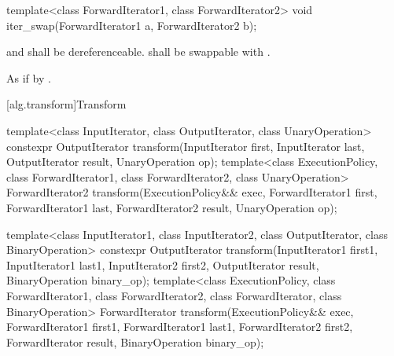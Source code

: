 %
\begin{itemdecl}
template<class ForwardIterator1, class ForwardIterator2>
  void iter_swap(ForwardIterator1 a, ForwardIterator2 b);
\end{itemdecl}

\begin{itemdescr}
\pnum
\requires
{} and  shall be dereferenceable.  shall be
swappable with .

\pnum
\effects
As if by .
\end{itemdescr}

[alg.transform]{Transform}

%
\begin{itemdecl}
template<class InputIterator, class OutputIterator,
         class UnaryOperation>
  constexpr OutputIterator
    transform(InputIterator first, InputIterator last,
              OutputIterator result, UnaryOperation op);
template<class ExecutionPolicy, class ForwardIterator1, class ForwardIterator2,
         class UnaryOperation>
  ForwardIterator2
    transform(ExecutionPolicy&& exec,
              ForwardIterator1 first, ForwardIterator1 last,
              ForwardIterator2 result, UnaryOperation op);

template<class InputIterator1, class InputIterator2,
         class OutputIterator, class BinaryOperation>
  constexpr OutputIterator
    transform(InputIterator1 first1, InputIterator1 last1,
              InputIterator2 first2, OutputIterator result,
              BinaryOperation binary_op);
template<class ExecutionPolicy, class ForwardIterator1, class ForwardIterator2,
         class ForwardIterator, class BinaryOperation>
  ForwardIterator
    transform(ExecutionPolicy&& exec,
              ForwardIterator1 first1, ForwardIterator1 last1,
              ForwardIterator2 first2, ForwardIterator result,
              BinaryOperation binary_op);
\end{itemdecl}

